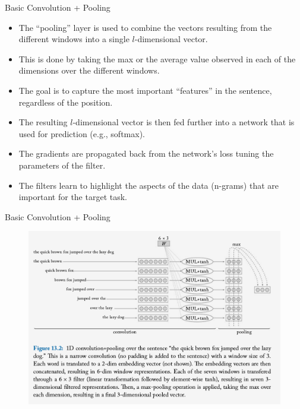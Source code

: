 \documentclass[handout]{beamer}
\begin{document}
\begin{frame}{Basic Convolution  + Pooling}
\begin{scriptsize}
\begin{itemize}
\item The ``pooling'' layer is used
to combine the vectors resulting from the different windows into a single $l$-dimensional vector.
\item This is done by taking the max or the average value observed in each of the dimensions over the different windows.
\item The goal is to capture the most important ``features'' in the sentence, regardless of the position.
\item The resulting $l$-dimensional vector is then fed further into a network that is used for prediction (e.g., softmax).
\item The gradients are propagated back from the network's loss tuning the parameters of the filter.
\item The filters learn to highlight the aspects of the data (n-grams) that are important for the target task. 
\end{itemize}
\end{scriptsize}
\end{frame}



\begin{frame}{Basic Convolution  + Pooling}
  \begin{figure}[h]
        	\includegraphics[scale = 0.28]{pics/CNN.png}
        \end{figure}
\end{frame}
\end{document}
